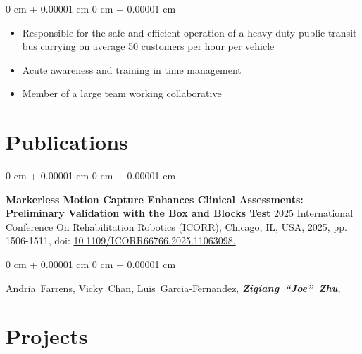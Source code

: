 \documentclass[10pt, letterpaper]{article}
\newenvironment{highlights}{
    \begin{itemize}[
        topsep=0.10 cm,
        parsep=0.10 cm,
        partopsep=0pt,
        itemsep=0pt,
        leftmargin=0 cm + 10pt
    ]
}{
    \end{itemize}
} %
\newenvironment{onecolentry}{
    \begin{adjustwidth}{
        0 cm + 0.00001 cm
    }{
        0 cm + 0.00001 cm
    }
}{
    \end{adjustwidth}
} %
\begin{document}
        \vspace{0.10 cm}
        \begin{onecolentry}
            \begin{highlights}
                \item Responsible for the safe and efficient operation of a heavy duty public transit bus carrying on average 50 customers per hour per vehicle
                \item Acute awareness and training in time management
                \item Member of a large team working collaborative

            \end{highlights}
        \end{onecolentry}



    
    \section{Publications}



        
        \begin{samepage}
            \begin{onecolentry}
                \textbf{Markerless Motion Capture Enhances Clinical Assessments: Preliminary Validation with the Box and Blocks Test} 2025 International Conference On Rehabilitation Robotics (ICORR), Chicago, IL, USA, 2025, pp. 1506-1511, doi: \href{https://doi.org/10.1109/ICORR66766.2025.11063098}{10.1109/ICORR66766.2025.11063098.}
                \label{pub:markerless-motion-capture}
            \end{onecolentry}

            \vspace{0.10 cm}
            
            \begin{onecolentry}
                \mbox{Andria Farrens}, \mbox{Vicky Chan}, \mbox{Luis Garcia-Fernandez}, \mbox{\textbf{\textit{Ziqiang “Joe” Zhu}}},

                \vspace{0.10 cm}
                
        \end{onecolentry}
        \end{samepage}


    
    \section{Projects}
\end{document}
